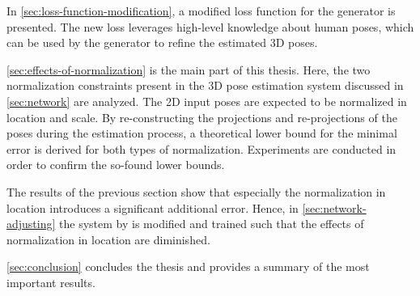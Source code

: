 In \autoref{sec:loss-function-modification}, a modified loss function for the generator is presented.
The new loss leverages high-level knowledge about human poses, which can be used by the generator to refine the estimated 3D poses.

\autoref{sec:effects-of-normalization} is the main part of this thesis.
Here, the two normalization constraints present in the 3D pose estimation system discussed in \autoref{sec:network} are analyzed.
The 2D input poses are expected to be normalized in location and scale.
By re-constructing the projections and re-projections of the poses during the estimation process, a theoretical lower bound for the minimal error is derived for both types of normalization.
Experiments are conducted in order to confirm the so-found lower bounds.

The results of the previous section show that especially the normalization in location introduces a significant additional error.
Hence, in \autoref{sec:network-adjusting} the system by \citet{drover18} is modified and trained such that the effects of normalization in location are diminished.

\autoref{sec:conclusion} concludes the thesis and provides a summary of the most important results.